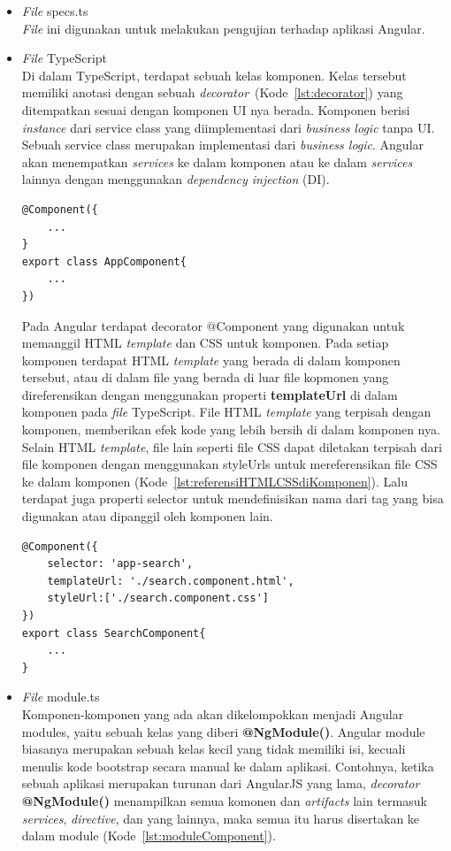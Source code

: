 \begin{itemize}
	\item \textit{File} specs.ts \\
		\textit{File} ini digunakan untuk melakukan pengujian terhadap aplikasi Angular. 
		
	\item \textit{File} TypeScript \\
		Di dalam TypeScript, terdapat sebuah kelas komponen. Kelas tersebut memiliki anotasi dengan sebuah \textit{decorator}~(Kode~\ref{lst:decorator}) yang ditempatkan sesuai dengan komponen UI nya berada. Komponen berisi \textit{instance} dari service class yang diimplementasi dari \textit{business logic} tanpa UI. Sebuah service class merupakan implementasi dari \textit{business logic}. Angular akan menempatkan \textit{services} ke dalam komponen atau ke dalam \textit{services} lainnya dengan menggunakan \textit{dependency injection} (DI). 	

\begin{lstlisting}[label={lst:decorator}, caption=Anotasi Komponen dengan \textit{Decorator}]
@Component({
	...
}
export class AppComponent{
	...
})
\end{lstlisting} 

		Pada Angular terdapat decorator @Component yang digunakan untuk memanggil HTML \textit{template} dan CSS untuk komponen. Pada setiap komponen terdapat HTML \textit{template} yang berada di dalam komponen tersebut, atau di dalam file yang berada di luar file kopmonen yang direferensikan dengan menggunakan properti \textbf{templateUrl} di dalam komponen pada \textit{file} TypeScript. File HTML \textit{template} yang terpisah dengan komponen, memberikan efek kode yang lebih bersih di dalam komponen nya. Selain HTML \textit{template}, file lain seperti file CSS dapat diletakan terpisah dari file komponen dengan menggunakan styleUrls untuk mereferensikan file CSS ke dalam komponen (Kode~\ref{lst:referensiHTMLCSSdiKomponen}). Lalu terdapat juga properti selector untuk mendefinisikan nama dari tag yang bisa digunakan atau dipanggil oleh komponen lain.


\begin{lstlisting}[label={lst:referensiHTMLCSSdiKomponen}, caption=Contoh Mereferensikan HTML dan CSS di Dalam Komponen]
@Component({
	selector: 'app-search',
	templateUrl: './search.component.html',
	styleUrl:['./search.component.css']
})
export class SearchComponent{
	...
}
\end{lstlisting} 

	\item \textit{File} module.ts \\
	Komponen-komponen yang ada akan dikelompokkan menjadi Angular modules, yaitu sebuah kelas yang diberi \textbf{@NgModule()}. Angular module biasanya merupakan sebuah kelas kecil yang tidak memiliki isi, kecuali menulis kode bootstrap secara manual ke dalam aplikasi. Contohnya, ketika sebuah aplikasi merupakan turunan dari AngularJS yang lama, \textit{decorator} \textbf{@NgModule()} menampilkan semua komonen dan \textit{artifacts} lain termasuk \textit{services}, \textit{directive}, dan yang lainnya, maka semua itu harus disertakan ke dalam module (Kode~\ref{lst:moduleComponent}). 


\end{itemize}
